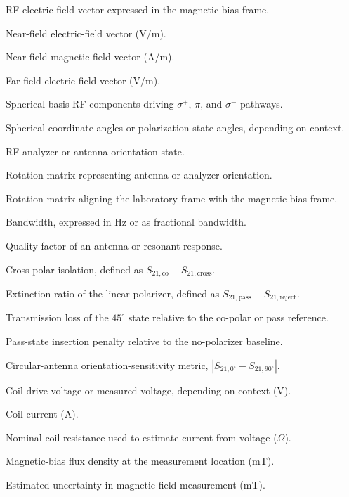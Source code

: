 \documentclass{ieeeaccess}
\begin{document}
\begin{IEEEdescription}
\item[$\mathbf{E}_{B}$] RF electric-field vector expressed in the magnetic-bias frame.
\item[$\mathbf{E}_{\mathrm{near}}$] Near-field electric-field vector (V/m).
\item[$\mathbf{H}_{\mathrm{near}}$] Near-field magnetic-field vector (A/m).
\item[$\mathbf{E}_{\mathrm{far}}$] Far-field electric-field vector (V/m).
\item[$E_{+1},E_0,E_{-1}$] Spherical-basis RF components driving \(\sigma^+\), \(\pi\), and \(\sigma^-\) pathways.
\item[$\theta,\phi$] Spherical coordinate angles or polarization-state angles, depending on context.
\item[$\theta_{\mathrm{RF}}$] RF analyzer or antenna orientation state.
\item[$\mathbf{R}_{\theta}$] Rotation matrix representing antenna or analyzer orientation.
\item[$\mathbf{R}_{B}$] Rotation matrix aligning the laboratory frame with the magnetic-bias frame.
\item[$\mathrm{BW}$] Bandwidth, expressed in Hz or as fractional bandwidth.
\item[$Q$] Quality factor of an antenna or resonant response.
\item[$\mathrm{XPI}$] Cross-polar isolation, defined as \(S_{21,\mathrm{co}}-S_{21,\mathrm{cross}}\).
\item[$\mathrm{ER}$] Extinction ratio of the linear polarizer, defined as \(S_{21,\mathrm{pass}}-S_{21,\mathrm{reject}}\).
\item[$L_{45}$] Transmission loss of the \(45^\circ\) state relative to the co-polar or pass reference.
\item[$L_{\mathrm{pass}}$] Pass-state insertion penalty relative to the no-polarizer baseline.
\item[$\Delta S_{21,\mathrm{CP}}$] Circular-antenna orientation-sensitivity metric, \(|S_{21,0^\circ}-S_{21,90^\circ}|\).
\item[$V$] Coil drive voltage or measured voltage, depending on context (V).
\item[$I$] Coil current (A).
\item[$R_{\mathrm{nom}}$] Nominal coil resistance used to estimate current from voltage (\(\Omega\)).
\item[$B_0$] Magnetic-bias flux density at the measurement location (mT).
\item[$u_B$] Estimated uncertainty in magnetic-field measurement (mT).

\end{IEEEdescription}
\end{document}
